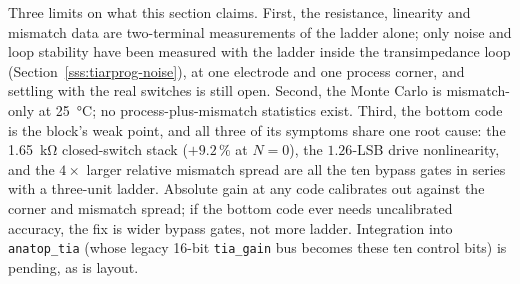 %
%

Three limits on what this section claims. First, the resistance, linearity and
mismatch data are two-terminal measurements of the ladder alone; only noise and
loop stability have been measured with the ladder inside the transimpedance loop
(Section~\ref{sss:tiarprog-noise}), at one electrode and one process corner, and
settling with the real switches is still open. Second, the Monte Carlo is
mismatch-only at \SI{25}{\celsius}; no process-plus-mismatch statistics exist. Third, the bottom code is the block's
weak point, and all three of its symptoms share one root cause: the
\SI{1.65}{\kilo\ohm} closed-switch stack (\(+9.2\,\%\) at \(N=0\)), the
\(1.26\)-LSB drive nonlinearity, and the \(4\times\) larger relative mismatch
spread are all the ten bypass gates in series with a three-unit ladder. Absolute
gain at any code calibrates out against the corner and mismatch spread; if the
bottom code ever needs uncalibrated accuracy, the fix is wider bypass gates, not
more ladder. Integration into \texttt{anatop\_tia} (whose legacy 16-bit
\texttt{tia\_gain} bus becomes these ten control bits) is pending, as is layout.
